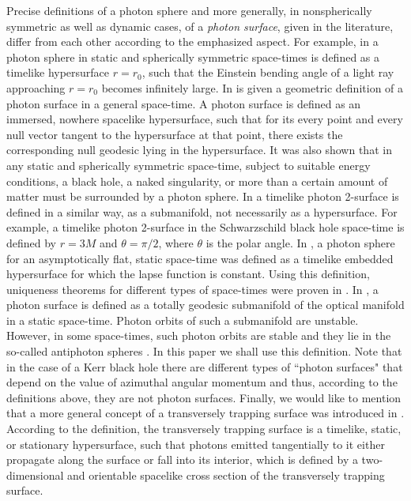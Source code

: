 \documentclass[twocolumn,showpacs,preprintnumbers,amsmath,amssymb,floatfix,nofootinbib]{revtex4-1}
\begin{document}
Precise definitions of a photon sphere and more generally, in nonspherically symmetric as well as dynamic cases, of a {\em photon surface}, given in the literature, differ from each other according to the emphasized aspect. For example, in \cite{Virbhadra:1999nm} a photon sphere in static and spherically symmetric space-times is defined as a timelike hypersurface $r=r_0$, such that the Einstein bending angle of a light ray approaching $r=r_0$ becomes infinitely large. In \cite{Claudel:2000yi} is given a geometric definition of a photon surface in a general space-time. A photon surface is defined as an immersed, nowhere spacelike hypersurface, such that for its every point and every null vector tangent to the hypersurface at that point, there exists the corresponding null geodesic lying in the hypersurface. It was also shown that in any static and spherically symmetric space-time, subject to suitable energy conditions, a black hole, a naked singularity, or more than a certain amount of matter must be surrounded by a photon sphere. In \cite{Foertsch:2003ze} a timelike photon 2-surface is defined in a similar way, as a submanifold, not necessarily as a hypersurface. For example, a timelike photon 2-surface in the Schwarzschild black hole space-time is defined by $r=3M$ and $\theta=\pi/2$, where $\theta$ is the polar angle. In \cite{Cederbaum:2014gva}, a photon sphere for an asymptotically flat, static space-time was defined as a timelike embedded hypersurface for which the lapse function is constant. Using this definition, uniqueness theorems for different types of space-times were proven in \cite{Cederbaum:2014gva,Cederbaum:2015aha,Yazadjiev:2015hda,Cederbaum:2015fra,Yazadjiev:2015mta,Yazadjiev:2015jza,Rogatko:2016mho,Tomikawa:2016dqz,Tomikawa:2017vun}. In \cite{Gibbons:2016isj}, a photon surface is defined as a totally geodesic submanifold of the optical manifold in a static space-time. Photon orbits of such a submanifold are unstable. However, in some space-times, such photon orbits are stable and they lie in the so-called antiphoton spheres \cite{Gibbons:2016isj}. In this paper we shall use this definition. Note that in the case of a Kerr black hole there are different types of ``photon surfaces" that depend on the value of azimuthal angular momentum \cite{Teo} and thus, according to the definitions above, they are not photon surfaces. Finally, we would like to mention that a more general concept of a transversely trapping surface was introduced in \cite{Shiromizu:2017ego,Yoshino:2017gqv}. According to the definition, the transversely trapping surface is a timelike, static, or stationary hypersurface, such that photons emitted tangentially to it either propagate along the surface or fall into its interior, which is defined by a two-dimensional and orientable spacelike cross section of the transversely trapping surface. 
\end{document}
